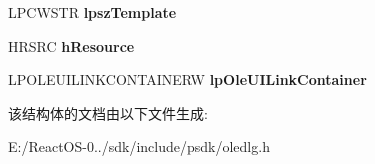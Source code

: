 \begin{DoxyCompactItemize}
\item 
\mbox{\label{structtag_o_l_e_u_i_e_d_i_t_l_i_n_k_s_w_a26e024072055142400df3c44e62e54c9}} 
L\+P\+C\+W\+S\+TR {\bfseries lpsz\+Template}
\item 
\mbox{\label{structtag_o_l_e_u_i_e_d_i_t_l_i_n_k_s_w_a55c4d04ddf8076fb1f28444648a5f639}} 
H\+R\+S\+RC {\bfseries h\+Resource}
\item 
\mbox{\label{structtag_o_l_e_u_i_e_d_i_t_l_i_n_k_s_w_a26e84d04a62bea5bc85e93419bd6386d}} 
L\+P\+O\+L\+E\+U\+I\+L\+I\+N\+K\+C\+O\+N\+T\+A\+I\+N\+E\+RW {\bfseries lp\+Ole\+U\+I\+Link\+Container}
\end{DoxyCompactItemize}


该结构体的文档由以下文件生成\+:\begin{DoxyCompactItemize}
\item 
E\+:/\+React\+O\+S-\/0../sdk/include/psdk/oledlg.\+h\end{DoxyCompactItemize}
